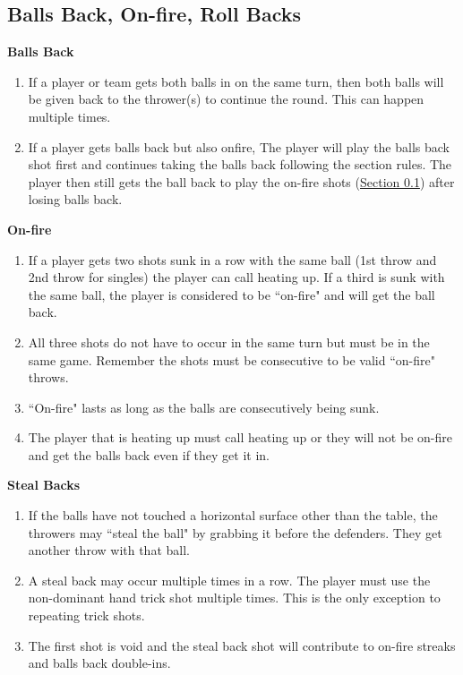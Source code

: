 	\subsection{Balls Back, On-fire, Roll Backs}\label{ssec:BallsBack}
        \noindent\textbf{Balls Back}
        \begin{enumerate}[label=(\roman*)]
            \item \label{sssec:BallsBack,bothin} If a player or team gets both balls in on the same turn, then both balls will be given back to the thrower(s) to continue the round.
                This can happen multiple times.
            \item \label{sssec:BallsBack,onfire_combine} If a player gets balls back but also onfire, The player will play the balls back shot first and continues taking the balls back following the section rules.
                The player then still gets the ball back to play the on-fire shots (\hyperref[ssec:BallsBack]{Section \ref{ssec:BallsBack}}) after losing balls back.
        \end{enumerate}
        \noindent\textbf{On-fire}
        \begin{enumerate}[label=(\roman*)]
            \item \label{sssec:BallsBack,onfire} If a player gets two shots sunk in a row with the same ball (1st throw and 2nd throw for singles) the player can call heating up.
                If a third is sunk with the same ball, the player is considered to be ``on-fire" and will get the ball back. 
            \item \label{sssec:BallsBack,onfire_reset} All three shots do not have to occur in the same turn but must be in the same game. Remember the shots must be consecutive to be valid ``on-fire" throws.
            \item \label{sssec:BallsBack,onfire_multiple} ``On-fire" lasts as long as the balls are consecutively being sunk. 
            \item \label{sssec:BallsBack,onfire_calling} The player that is heating up must call heating up or they will not be on-fire and get the balls back even if they get it in.
        \end{enumerate}
        \noindent\textbf{Steal Backs}
        \begin{enumerate}[label=(\roman*)]
            \item \label{sssec:BallsBack,stealback} If the balls have not touched a horizontal surface other than the table, the throwers may ``steal the ball" by grabbing it before the defenders.
                They get another throw with that ball.
            \item \label{sssec:BallsBack,stealback_multi} A steal back may occur multiple times in a row.
                The player must use the non-dominant hand trick shot multiple times. This is the only exception to repeating trick shots.
            \item \label{sssec:BallsBack,stealback_redo} The first shot is void and the steal back shot will contribute to on-fire streaks and balls back double-ins.
        \end{enumerate}
